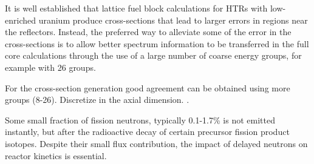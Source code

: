 \documentclass[11pt,letterpaper]{article}
\begin{document}

It is well established that lattice fuel block calculations for HTRs with low-enriched uranium produce cross-sections that lead to larger errors in regions near the reflectors.
Instead, the preferred way to alleviate some of the error in the cross-sections is to allow better spectrum information to be transferred in the full core calculations through the use of a large number of coarse energy groups, for example with 26 groups.
\cite{oecd_nea_coupled_2020}

For the cross-section generation good agreement can be obtained using more groups (8-26).
Discretize in the axial dimension.
\cite{gougar_high_2019}.


Some small fraction of fission neutrons, typically 0.1-1.7\% is not emitted instantly, but after the radioactive decay of certain precursor fission product isotopes.
Despite their small flux contribution, the impact of delayed neutrons on reactor kinetics is essential.


\cite{leppanen_development_2007}





\pagebreak


\end{document}
